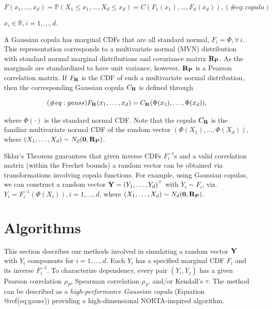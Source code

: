 \documentclass[
]{jss}
\begin{document}
\begin{equation}
F(x_1, \ldots, x_d) = {\mathbb P}(X_1\leq x_1, \ldots,X_d\leq x_d) = C(F_1(x_1), \ldots, F_d(x_d)), 
(\#eq:copula)
\end{equation}

\(x_i \in {\mathbb R}, i=1,\ldots,d.\)

A Gaussian copula has marginal CDFs that are all standard normal,
\(F_i = \Phi, \forall \, i\). This representation corresponds to a
multivariate normal (MVN) distribution with standard normal marginal
distributions and covariance matrix \({\bf R_P}\). As the marginals are
standardized to have unit variance, however, \({\bf R_P}\) is a Pearson
correlation matrix. If \(F_{{\bf R}}\) is the CDF of such a multivariate
normal distribution, then the corresponding Gaussian copula
\(C_{{\bf R}}\) is defined through

\begin{equation}
(\#eq:gauss)
F_{{\bf R}}(x_1, \ldots, x_d) = C_{{\bf R}}(\Phi(x_1), \ldots, \Phi(x_d)),
\end{equation}

where \(\Phi(\cdot)\) is the standard normal CDF. Note that the copula
\(C_{{\bf R}}\) is the familiar multivariate normal CDF of the random
vector \((\Phi(X_1), \ldots, \Phi(X_d))\), where
\((X_1, \ldots, X_d) \sim N_d({\bf 0}, {\bf R_P})\).

Sklar's Theorem \citep{Sklar1959, Ubeda-Flores2017} guarantees that
given inverse CDFs \(F_i^{-1}\)s and a valid correlation matrix (within
the Frechet bounds) a random vector can be obtained via transformations
involving copula functions. For example, using Gaussian copulas, we can
construct a random vector \({\bf Y} = (Y_1, \ldots, Y_d)^\top\) with
\(Y_i \sim F_i\), viz.~\(Y_i = F_i^{-1}(\Phi(X_i)), i=1, \ldots, d\),
where \((X_1, \ldots, X_d) \sim N_d({\bf 0}, {\bf R_P})\).

\hypertarget{algorithms}{%
\section{Algorithms}\label{algorithms}}

This section describes our methods involved in simulating a random
vector \(\bf Y\) with \(Y_i\) components for \(i=1,\ldots,d\). Each
\(Y_i\) has a specified marginal CDF \(F_i\) and its inverse
\(F^{-1}_i\). To characterize dependency, every pair \((Y_i, Y_j)\) has
a given Pearson correlation \(\rho_P\), Spearman correlation \(\rho_S\),
and/or Kendall's \(\tau\). The method can be described as a
\emph{high-performance Gaussian copula} (Equation @ref(eq:gauss))
providing a high-dimensional NORTA-inspired algorithm.
\end{document}
